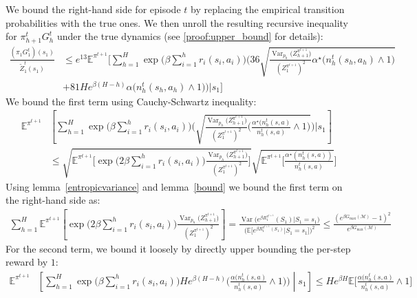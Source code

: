 \documentclass[final,12pt]{colt2026} %
\begin{document}
We bound the right-hand side for episode $t$ by replacing the empirical transition probabilities with the true ones. We then unroll the resulting recursive inequality for $\pi_{h+1}^t G_h^t$ under the true dynamics (see \ref{proof:upper_bound} for details):
\begin{align*}
\frac{(\pi_1 G_1^{t})(s_1)}{\widetilde{Z}_1^t(s_1)}&
\leq e^{13}
\mathbb{E}^{\pi^{t+1}}\Bigg[
\sum_{h=1}^{H} 
\exp\Big(\beta\sum_{i=1}^{h} r_i(s_i,a_i)\Big)
\Bigg(
36\sqrt{\frac{\operatorname{Var}_{p_h}\big(Z_{h+1}^{\pi^{t+1}}\big)}{(Z_1^{\pi^{t+1}})^2}\alpha^\star\big(n_h^t(s_h,a_h) \wedge 1\big)}
\\&+
81He^{\beta(H-h)}\alpha\big(n_h^t(s_h,a_h) \wedge 1\big)
\Bigg)
\Bigg| s_1
\Bigg]
\end{align*}
We bound the first term using Cauchy-Schwartz inequality:
\begin{align*}
    \mathbb{E}^{\pi^{t+1}} & \left[\sum_{h=1}^{H}  
\exp\Big(\beta \sum_{i=1}^{h} r_i(s_i,a_i)\Big)
\Bigg(
\sqrt{\frac{\operatorname{Var}_{p_h}\big(Z_{h+1}^{\pi^{t+1}}\big)}{(Z_1^{\pi^{t+1}})^2}\big(\frac{\alpha^\star\big(n_h^t(s,a)}{n_h^t(s,a)} \wedge 1 \big)}\Big) \Bigg| s_1\right]\\ &\leq \sqrt{\mathbb{E}^{\pi^{t+1}}\Big[\exp\Big(2\beta \sum_{i=1}^{h} r_i(s_i,a_i)\Big) \frac{\operatorname{Var}_{p_h}\big(Z_{h+1}^{\pi^{t+1}}\big)}{(Z_1^{\pi^{t+1}})^2}\Big]} \sqrt{\mathbb{E}^{\pi^{t+1}}\Big[\frac{\alpha^\star(n_h^t(s,a))}{n_h^t(s,a)}}\Big]
\end{align*}
Using lemma~\ref{entropicvariance} and lemma~\ref{bound} we bound the first term on the right-hand side as:
\begin{align*}
    \sum_{h=1}^H \mathbb{E}^{\pi^{t+1}} \!\!\left[ \exp\Big(2 \beta \sum_{i=1}^{h} r_i(s_i,a_i)\Big)\frac{\operatorname{Var}_{p_h}\big(Z_{h+1}^{\pi^{t+1}}\big)}{(Z_1^{\pi^{t+1}})^2} \right] \!=\! \frac{\operatorname{Var}\big(e^{\beta R_1^{\pi^{t+1}}}(S_1)\big|S_1=s_1\Big)}{\Big(\mathbb{E}\Big[e^{\beta R_1^{\pi^{t+1}}(S_1)}\big|S_1 = s_1 \Big]\Big)^2} \!\leq \!\frac{\left(e^{\beta G_{\text{max}}(\mathcal{M})} - 1\right)^2}{e^{\beta G_{\text{max}}(\mathcal{M})}}
\end{align*}
For the second term, we bound it loosely by directly upper bounding the per-step reward by $1$:
\begin{align*}
   \mathbb{E}^{\pi^{t+1}} & \left[
\sum_{h=1}^{H}
\exp\Big(\beta\sum_{i=1}^{h} r_i(s_i,a_i)\Big)
He^{\beta(H-h)}\big(\frac{\alpha\big(n_h^t(s,a)}{n_h^t(s,a)} \wedge 1 \big)
\Bigg)
\middle| s_1
\right] \leq  H e^{\beta H} \mathbb{E} \Big[\frac{\alpha\big(n_h^t(s,a)}{n_h^t(s,a)} \wedge 1 \Big]
\end{align*}
\end{document}
